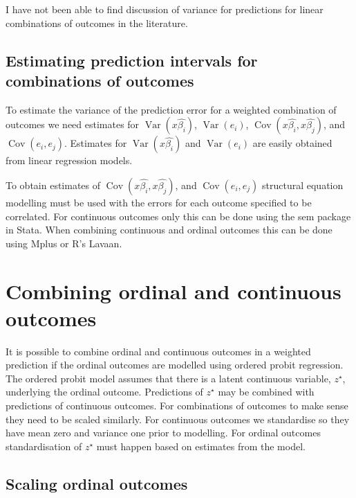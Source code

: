 \documentclass[12pt]{article}
\newcommand{\Var}{\operatorname{Var}}
\newcommand{\Cov}{\operatorname{Cov}}
\begin{document}
I have not been able to find discussion of variance for predictions for linear combinations of outcomes in the literature.



\subsection{Estimating prediction intervals for combinations of outcomes} %
\label{sub:estimating_prediction_intervals_for_combinations_of_outcomes}

To estimate the variance of the prediction error for a weighted combination of outcomes we need estimates for \(\Var(x\hat{\beta_i})\), \(\Var(e_i)\), \(\Cov(x\hat{\beta_i}, x\hat{\beta_j})\), and \(\Cov(e_i, e_j)\). Estimates for \(\Var(x\hat{\beta_i})\) and \(\Var(e_i)\) are easily obtained from linear regression models. 

To obtain estimates of \(\Cov(x\hat{\beta_i}, x\hat{\beta_j})\), and \(\Cov(e_i, e_j)\) structural equation modelling must be used with the errors for each outcome specified to be correlated. For continuous outcomes only this can be done using the sem package in Stata. When combining continuous and ordinal outcomes this can be done using Mplus or R's Lavaan.

\section{Combining ordinal and continuous outcomes} %
\label{sec:combining_ordinal_and_continuous_outcomes}

It is possible to combine ordinal and continuous outcomes in a weighted prediction if the ordinal outcomes are modelled using ordered probit regression. The ordered probit model assumes that there is a latent continuous variable, \(z^\star\),  underlying the ordinal outcome.  Predictions of \(z^\star\) may be combined with predictions of continuous outcomes. For combinations of outcomes to make sense they need to be scaled similarly. For continuous outcomes we standardise so they have mean zero and variance one prior to modelling. For ordinal outcomes standardisation of \(z^\star\) must happen based on estimates from the model. 

\subsection{Scaling ordinal outcomes} %
\label{sub:scaling_ordinal_outcomes}
\end{document}
